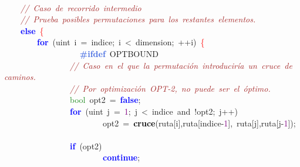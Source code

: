 \mbox{} \\
\mbox{}\ \ \ \ \textit{\textcolor{Brown}{//\ Caso\ de\ recorrido\ intermedio}} \\
\mbox{}\ \ \ \ \textit{\textcolor{Brown}{//\ Prueba\ posibles\ permutaciones\ para\ los\ restantes\ elementos.}} \\
\mbox{}\ \ \ \ \textbf{\textcolor{Blue}{else}}\ \textcolor{Red}{\{} \\
\mbox{}\ \ \ \ \ \ \ \ \textbf{\textcolor{Blue}{for}}\ \textcolor{BrickRed}{(}\textcolor{TealBlue}{uint}\ i\ \textcolor{BrickRed}{=}\ indice\textcolor{BrickRed}{;}\ i\ \textcolor{BrickRed}{\textless{}}\ dimension\textcolor{BrickRed}{;}\ \textcolor{BrickRed}{++}i\textcolor{BrickRed}{)}\ \textcolor{Red}{\{} \\
\mbox{}\textbf{\textcolor{RoyalBlue}{\ \ \ \ \ \ \ \ \ \ \ \ \ \ \ \ \#ifdef}}\ OPTBOUND \\
\mbox{}\ \ \ \ \ \ \ \ \ \ \ \ \ \ \ \ \textit{\textcolor{Brown}{//\ Caso\ en\ el\ que\ la\ permutación\ introduciría\ un\ cruce\ de\ caminos.}} \\
\mbox{}\ \ \ \ \ \ \ \ \ \ \ \ \ \ \ \ \textit{\textcolor{Brown}{//\ Por\ optimización\ OPT-2,\ no\ puede\ ser\ el\ óptimo.}} \\
\mbox{}\ \ \ \ \ \ \ \ \ \ \ \ \ \ \ \ \textcolor{ForestGreen}{bool}\ opt2\ \textcolor{BrickRed}{=}\ \textbf{\textcolor{Blue}{false}}\textcolor{BrickRed}{;} \\
\mbox{}\ \ \ \ \ \ \ \ \ \ \ \ \ \ \ \ \textbf{\textcolor{Blue}{for}}\ \textcolor{BrickRed}{(}\textcolor{TealBlue}{uint}\ j\ \textcolor{BrickRed}{=}\ \textcolor{Purple}{1}\textcolor{BrickRed}{;}\ j\ \textcolor{BrickRed}{\textless{}}\ \textcolor{TealBlue}{indice}\ and\ \textcolor{BrickRed}{!}opt2\textcolor{BrickRed}{;}\ j\textcolor{BrickRed}{++)} \\
\mbox{}\ \ \ \ \ \ \ \ \ \ \ \ \ \ \ \ \ \ \ \ \ \ \ \ opt2\ \textcolor{BrickRed}{=}\ \textbf{\textcolor{Black}{cruce}}\textcolor{BrickRed}{(}ruta\textcolor{BrickRed}{[}i\textcolor{BrickRed}{],}ruta\textcolor{BrickRed}{[}indice\textcolor{BrickRed}{-}\textcolor{Purple}{1}\textcolor{BrickRed}{],}\ ruta\textcolor{BrickRed}{[}j\textcolor{BrickRed}{],}ruta\textcolor{BrickRed}{[}j\textcolor{BrickRed}{-}\textcolor{Purple}{1}\textcolor{BrickRed}{]);} \\
\mbox{} \\
\mbox{}\ \ \ \ \ \ \ \ \ \ \ \ \ \ \ \ \textbf{\textcolor{Blue}{if}}\ \textcolor{BrickRed}{(}opt2\textcolor{BrickRed}{)} \\
\mbox{}\ \ \ \ \ \ \ \ \ \ \ \ \ \ \ \ \ \ \ \ \ \ \ \ \textbf{\textcolor{Blue}{continue}}\textcolor{BrickRed}{;} \\
